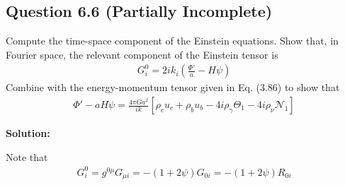 \documentclass[11pt]{article}
\begin{document}
\subsection{Question 6.6 (Partially Incomplete)}
Compute the time-space component of the Einstein equations. Show that, in Fourier space, the relevant component of the Einstein tensor is 
\begin{align*}
    G^0_i = 2i k_i \left( \frac{\Phi'}{a} - H \psi \right) 
\end{align*}
Combine with the energy-momentum tensor given in Eq. (3.86) to show that 
\begin{align*}
    \Phi' - aH \psi = \frac{4\pi G a^2}{ik} [ \rho_c u_c + \rho_b u_b - 4i \rho_\gamma \Theta_1 - 4i\rho_\nu \mathcal{N}_1]
\end{align*}

\textbf{Solution:}

Note that 
\begin{align*}
    G^0_i = g^{0\mu}G_{\mu i} = -(1 + 2\psi) G_{0i} = -(1+2\psi)R_{0i}
\end{align*}
\end{document}
